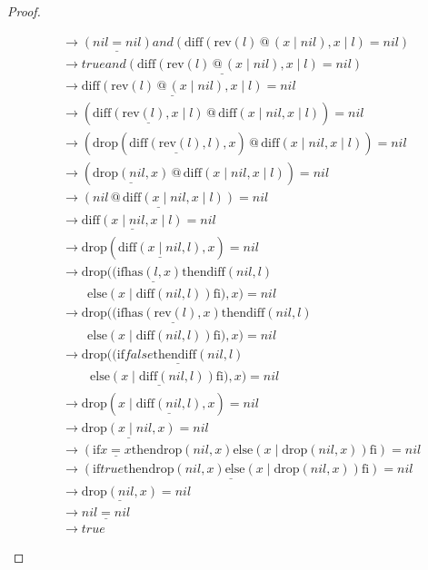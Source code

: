 \documentclass[12pt, a4paper]{article}
\newcommand{\rel}[1]{\mathrel{#1}}
\newcommand{\rmx}[1]{\mathrm{#1}}
\newcommand{\larrow}{\longrightarrow}
\newcommand{\under}{\underline}
\begin{document}
\begin{proof}
\begin{description}
\begin{align*}
	&\larrow \under{(nil = nil)} \rel{and} (\rmx{diff}(\rmx{rev}(l) \rel{@} (x \mid nil), x \mid l) = nil) \tag{by drop1} \\
	&\larrow \under{true \rel{and} (\rmx{diff}(\rmx{rev}(l) \rel{@} (x \mid nil), x \mid l) = nil)} \tag{by equality} \\
	&\larrow \under{\rmx{diff}(\rmx{rev}(l) \rel{@} (x \mid nil), x \mid l)} = nil \tag{by and} \\
	&\larrow (\under{\rmx{diff}(\rmx{rev}(l), x \mid l)} \rel{@} \rmx{diff}(x \mid nil, x \mid l)) = nil \tag{by Problem 9 - Lemma 1} \\
	&\larrow (\rmx{drop}(\under{\rmx{diff}(\rmx{rev}(l), l)}, x) \rel{@} \rmx{diff}(x \mid nil, x \mid l)) = nil \tag{by Problem 14} \\
	&\larrow (\under{\rmx{drop}(nil, x)} \rel{@} \rmx{diff}(x \mid nil, x \mid l)) = nil \tag{by Problem 16} \\
	&\larrow \under{(nil \rel{@} \rmx{diff}(x \mid nil, x \mid l))} = nil \tag{by drop1} \\
	&\larrow \under{\rmx{diff}(x \mid nil, x \mid l)} = nil \tag{by @1} \\
	 &\larrow \rmx{drop}(\under{\rmx{diff}(x \mid nil, l)}, x) = nil \tag{by Problem 14} \\
	 &\larrow \rmx{drop}((\rel{\rmx{if}} \under{\rmx{has}(l, x)} \rel{\rmx{then}} \rmx{diff}(nil, l) \\
	 &\quad \quad \rel{\rmx{else}} (x \mid \rmx{diff}(nil, l)) \rel{\rmx{fi}}), x) = nil \tag{by diff2} \\
	 &\larrow \rmx{drop}((\rel{\rmx{if}} \under{\rmx{has}(\rmx{rev}(l), x)} \rel{\rmx{then}} \rmx{diff}(nil, l) \\
	 &\quad \quad \rel{\rmx{else}} (x \mid \rmx{diff}(nil, l)) \rel{\rmx{fi}}), x) = nil \tag{by Problem 6} \\
	 &\larrow \rmx{drop}(\under{(\rel{\rmx{if}} false \rel{\rmx{then}} \rmx{diff}(nil, l)} \\
	 &\quad \quad\ \under{\rel{\rmx{else}} (x \mid \rmx{diff}(nil, l)) \rel{\rmx{fi}})}, x) = nil \tag{by case splitting} \\
	 &\larrow \rmx{drop}(x \mid \under{\rmx{diff}(nil, l)}, x) = nil \tag{by if2} \\
	 &\larrow \under{\rmx{drop}(x \mid nil, x)} = nil \tag{by diff1} \\
	&\larrow (\rel{\rmx{if}} \under{x = x} \rel{\rmx{then}} \rmx{drop}(nil, x) \rel{\rmx{else}} (x \mid \rmx{drop}(nil, x)) \rel{\rmx{fi}}) = nil \tag{by drop2} \\
	&\larrow \under{(\rel{\rmx{if}} true \rel{\rmx{then}} \rmx{drop}(nil, x) \rel{\rmx{else}} (x \mid \rmx{drop}(nil, x)) \rel{\rmx{fi}})} = nil \tag{by equality} \\
	&\larrow \under{\rmx{drop}(nil, x)} = nil \tag{by if1} \\
	 &\larrow \under{nil = nil} \tag{by drop1} \\
	 &\larrow true \tag{by equality}
\end{align*}
\end{description}
\end{proof}
\end{document}
